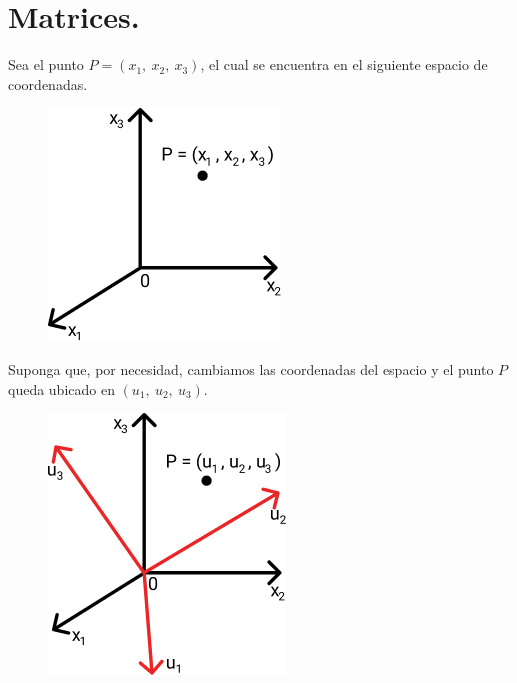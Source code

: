 \documentclass[12pt]{article}
\begin{document}
\section{Matrices.}

Sea el punto $P = (x_{1}, \ x_{2}, \ x_{3})$, el cual se encuentra en el siguiente espacio de coordenadas.

\begin{figure}[hbt!]
\centering
\includegraphics[scale=0.6]{img/matrices-1.jpg}
\end{figure}

Suponga que, por necesidad, cambiamos las coordenadas del espacio y el punto $P$ queda ubicado en $(u_{1}, \ u_{2}, \ u_{3})$.

\newpage

\begin{figure}[hbt!]
\centering
\includegraphics[scale=0.6]{img/matrices-2.jpg}
\end{figure}
\end{document}

